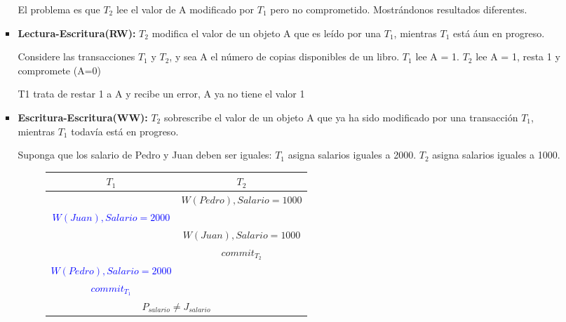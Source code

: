 \documentclass{templateNote}
\begin{document}
\begin{itemize}
\begin{itemize}
\begin{itemize}
            El problema es que $T_2$ lee el valor de A modificado por $T_1$ pero no comprometido. Mostrándonos resultados diferentes.

            \item \textbf{Lectura-Escritura(RW):} $T_2$ modifica el valor de un objeto A que es leído por una $T_1$, mientras $T_1$ está áun en progreso.
            
            Considere las transacciones $T_1$ y $T_2$, y sea A el número de copias disponibles de un libro.
            \subitem $T_1$ lee A = 1.
            \subitem $T_2$ lee A = 1, resta 1 y compromete (A=0)
            
            T1 trata de restar 1 a A y recibe un error, A ya no tiene el valor 1
            
            \item \textbf{Escritura-Escritura(WW):} $T_2$ sobrescribe el valor de un objeto A que ya ha sido modificado por una transacción $T_1$, mientras $T_1$ todavía está en progreso.
            
            Suponga que los salario de Pedro y Juan deben ser iguales:
            \subitem $T_1$ asigna salarios iguales a 2000.
            \subitem $T_2$ asigna salarios iguales a 1000.

            \begin{figure}[H]
                \centering
                \begin{tabular}{|c|c|}
                    \hline
                    \textbf{$T_1$} & \textbf{$T_2$} \\ \hline
                    & \textcolor{green!80!black}{$W(Pedro), Salario = 1000$} \\
                    \textcolor{blue}{$W(Juan), Salario = 2000$} & \\
                    & \textcolor{green!80!black}{$W(Juan), Salario = 1000$} \\
                    & \textcolor{green!80!black}{\textit{$commit_{T_2}$}} \\
                    \textcolor{blue}{$W(Pedro), Salario = 2000$} & \\
                    \textcolor{blue}{\textit{$commit_{T_1}$}} & \\ \hline
                    \multicolumn{2}{|c|}{$P_{salario} \neq J_{salario}$} \\ \hline
                \end{tabular}
            \end{figure}
        \end{itemize}


\end{itemize}
\end{itemize}
\end{document}

